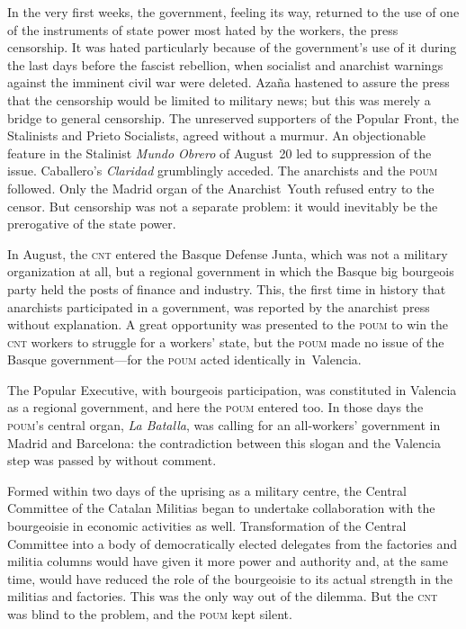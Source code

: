 In the very first weeks, the government, feeling its way, returned to the use of one of the instruments of state power most hated by the workers, the press censorship. It was hated particularly because of the government’s use of it during the last days before the fascist rebellion, when socialist and anarchist warnings against the imminent civil war were deleted. Azaña hastened to assure the press that the censorship would be limited to military news; but this was merely a bridge to general censorship. The unreserved supporters of the Popular Front, the Stalinists and Prieto Socialists, agreed without a murmur. An objectionable feature in the Stalinist \emph{Mundo Obrero}{\indexMundoObrero} of August~20 led to suppression of the issue. Caballero’s \emph{Claridad}{\indexClaridad} grumblingly acceded. The anarchists and the \textsc{poum} followed. Only the Madrid organ of the Anarchist~Youth refused entry to the censor. But censorship was not a separate problem: it would inevitably be the prerogative of the state power.

In August, the \textsc{cnt}{\indexCNT} entered the Basque Defense Junta, which was not a military organization at all, but a regional government in which the Basque big bourgeois party held the posts of finance and industry. This, the first time in history that anarchists participated in a government, was reported by the anarchist press without explanation. A great opportunity was presented to the \textsc{poum} to win the \textsc{cnt} workers to struggle for a workers’ state, but the \textsc{poum} made no issue of the Basque government---for the \textsc{poum} acted identically in~Valencia.

The Popular Executive, with bourgeois participation, was constituted in Valencia as a regional government, and here the \textsc{poum} entered too. In those days the \textsc{poum}’s central organ, \emph{La Batalla}{\indexLaBatalla}, was calling for an all-workers’ government in Madrid and Barcelona: the contradiction between this slogan and the Valencia step was passed by without comment.

Formed within two days of the uprising as a military centre, the Central Committee of the Catalan Militias began to undertake collaboration with the bourgeoisie in economic activities as well. Transformation of the Central Committee into a body of democratically elected delegates from the factories and militia columns would have given it more power and authority and, at the same time, would have reduced the role of the bourgeoisie to its actual strength in the militias and factories. This was the only way out of the dilemma. But the \textsc{cnt} was blind to the problem, and the \textsc{poum} kept silent.

